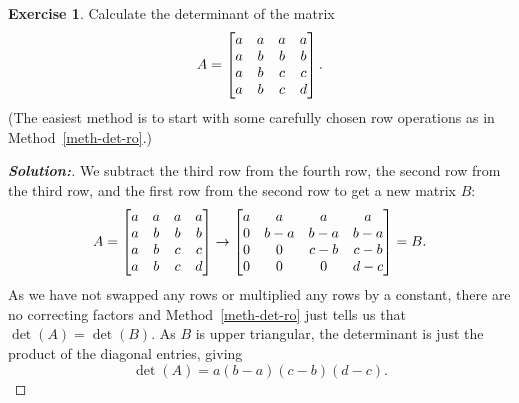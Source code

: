 \documentclass[a4paper]{amsart}
\theoremstyle{definition}
\newtheorem{exercise}{Exercise}
\newenvironment{solution}{\begin{proof}[\textbf{Solution:}] \vphantom{u}}{\end{proof}}
\begin{document}
\begin{exercise}\label{ex-det-iii}
 Calculate the determinant of the matrix
 \[ 
  A = \left[\begin{matrix}
       a & a & a & a \\
       a & b & b & b \\
       a & b & c & c \\
       a & b & c & d 
      \end{matrix}\right].
 \]
 (The easiest method is to start with some carefully chosen row
 operations as in Method~\ref{meth-det-ro}.) 
\end{exercise}
\begin{solution}
 We subtract the third row from the fourth row, the second row from
 the third row, and the first row from the second row to get a new
 matrix $B$:
 \[ 
  A = \left[\begin{matrix}
       a & a & a & a \\
       a & b & b & b \\
       a & b & c & c \\
       a & b & c & d 
      \end{matrix}\right]
  \to 
      \left[\begin{matrix}
       a & a   & a   & a   \\
       0 & b-a & b-a & b-a \\
       0 & 0   & c-b & c-b \\
       0 & 0   & 0   & d-c 
      \end{matrix}\right]
  = B.
 \]
 As we have not swapped any rows or multiplied any rows by a constant,
 there are no correcting factors and Method~\ref{meth-det-ro} just
 tells us that $\det(A)=\det(B)$.  As $B$ is upper triangular, the
 determinant is just the product of the diagonal entries, giving
 \[ \det(A) = a(b-a)(c-b)(d-c). \]
\end{solution}
\end{document}
